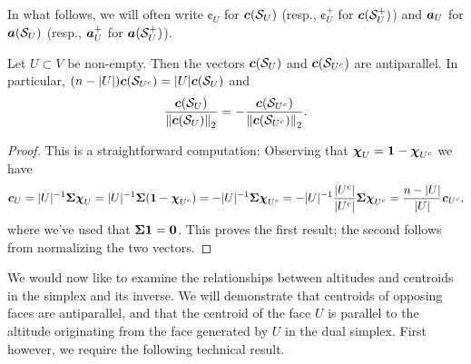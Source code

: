 In what follows,  we will often write $\cent_U$ for $\vb*{c}(\mathcal{S}_U)$ (resp., $\cent_U^+$ for $\vb*{c}(\mathcal{S}_U^+)$) and $\vb*{a}_U$ for $\vb*{a}(\mathcal{S}_U)$ (resp., $\vb*{a}_U^+$ for $\vb*{a}(\mathcal{S}_U^+)$). 

\begin{lemma}
\label{lem:complimentary_centroids}
Let $U\subset V$ be non-empty. Then the vectors $\vb*{c}(\mathcal{S}_U)$ and $\vb*{c}(\mathcal{S}_{U^c})$ are antiparallel. In particular, $(n-|U|)\vb*{c}(\mathcal{S}_{U^c}) = |U|\vb*{c}(\mathcal{S}_{U})$ and 
\[\frac{\vb*{c}(\mathcal{S}_U)}{\norm{\vb*{c}(\mathcal{S}_U)}_2}=-\frac{\vb*{c}(\mathcal{S}_{U^c})}{\norm{\vb*{c}(\mathcal{S}_{U^c})}_2}.\]
\end{lemma}
\begin{proof}
This is a straightforward computation: Observing that $\boldsymbol{\chi}_U=\vb{1}-\boldsymbol{\chi}_{U^c}$ we have  
\[\vb*{c}_U = |U|^{-1}\boldsymbol{\Sigma}\boldsymbol{\chi}_U = |U|^{-1}\boldsymbol{\Sigma}(\vb{1}-\boldsymbol{\chi}_{U^c})=-|U|^{-1}\boldsymbol{\Sigma}\boldsymbol{\chi}_{U^c}=-|U|^{-1}\frac{|U^c|}{|U^c|}\boldsymbol{\Sigma}\boldsymbol{\chi}_{U^c}=\frac{n-|U|}{|U|}\vb*{c}_{U^c},\]
where we've used that $\boldsymbol{\Sigma}\vb{1}=\vb{0}$. This proves the first result; the second follows from normalizing the two vectors.
\end{proof}

We would now like to examine the relationships between altitudes and centroids in the simplex and its inverse. We will demonstrate that centroids of opposing faces are antiparallel, and that the centroid of the face $U$ is parallel to the altitude originating from the face generated by $U$ in the dual simplex. First however, we require the following technical result. 

